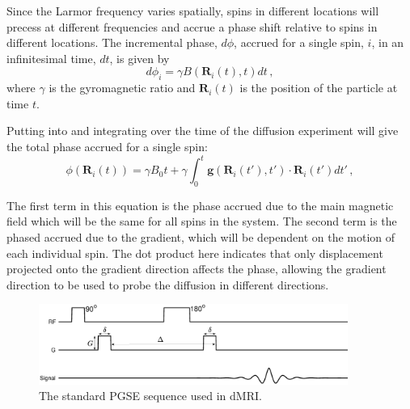 Since the Larmor frequency varies spatially, spins in different locations will precess at different frequencies and accrue a phase shift relative to spins in different locations. 
The incremental phase, $d\phi$, accrued for a single spin, $i$, in an infinitesimal time, $dt$, %
is given by
\begin{equation}
  d\phi_i = \gamma B(\mathbf{R}_i(t), t) dt\,,
  \label{eq:dphi}
\end{equation}
where $\gamma$ is the gyromagnetic ratio and  $\mathbf{R}_i(t)$ is the position of the particle at time $t$. %

Putting  into  and integrating over the time of the diffusion experiment will give the total phase accrued for a single spin:
\begin{equation}
  \phi(\mathbf{R}_i(t)) = \gamma B_0t + \gamma\int_0^t\mathbf{g}(\mathbf{R}_i(t'), t')\cdot\mathbf{R}_i(t')dt'\,,
  \label{eq:phase_singlespin}
\end{equation}


The first term in this equation is the phase accrued due to the main magnetic field which will be the same for all spins in the system.
The second term is the phased accrued due to the gradient, which will be dependent on the motion of each individual spin.
The dot product here indicates that only displacement projected onto the gradient direction affects the phase, allowing the gradient direction to be used to probe the diffusion in different directions.

\begin{figure}
  \centering
  \includegraphics[width=0.9\textwidth]{figures/background/PGSE_diagram.eps}
  \caption{The standard \acl{PGSE} sequence used in \ac{dMRI}.}
  \label{fig:PGSE_diagram}
\end{figure}

